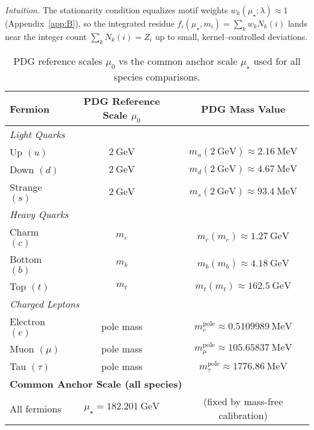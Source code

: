 \documentclass[aps,prd,onecolumn,amsmath,amssymb,superscriptaddress,nofootinbib,showpacs,showkeys]{revtex4-2}
\begin{document}
\emph{Intuition.} The stationarity condition equalizes motif weights $w_k(\mu_\star;\lambda)\approx1$ (Appendix~\ref{app:B}), so the integrated residue $f_i(\mu_\star,m_i)=\sum_k w_k N_k(i)$ lands near the integer count $\sum_k N_k(i)=Z_i$ up to small, kernel–controlled deviations.




\begin{table}[h!]
\centering
\caption{PDG reference scales \texorpdfstring{$\mu_0$}{mu0} vs the common anchor scale \texorpdfstring{$\mu_\star$}{mu*} used for all species comparisons.}
\label{tab:scales}
\begin{tabular}{lcc}
\toprule
\textbf{Fermion} & \textbf{PDG Reference Scale $\mu_0$} & \textbf{PDG Mass Value} \\
\midrule
\multicolumn{3}{l}{\textit{Light Quarks}} \\
Up $(u)$      & $2~\mathrm{GeV}$ & $m_u(2~\mathrm{GeV}) \approx 2.16~\mathrm{MeV}$ \\
Down $(d)$    & $2~\mathrm{GeV}$ & $m_d(2~\mathrm{GeV}) \approx 4.67~\mathrm{MeV}$ \\
Strange $(s)$ & $2~\mathrm{GeV}$ & $m_s(2~\mathrm{GeV}) \approx 93.4~\mathrm{MeV}$ \\
\midrule
\multicolumn{3}{l}{\textit{Heavy Quarks}} \\
Charm $(c)$   & $m_c$ & $m_c(m_c) \approx 1.27~\mathrm{GeV}$ \\
Bottom $(b)$  & $m_b$ & $m_b(m_b) \approx 4.18~\mathrm{GeV}$ \\
Top $(t)$     & $m_t$ & $m_t(m_t) \approx 162.5~\mathrm{GeV}$ \\
\midrule
\multicolumn{3}{l}{\textit{Charged Leptons}} \\
Electron $(e)$ & pole mass & $m_e^{\mathrm{pole}} \approx 0.5109989~\mathrm{MeV}$ \\
Muon $(\mu)$   & pole mass & $m_\mu^{\mathrm{pole}} \approx 105.65837~\mathrm{MeV}$ \\
Tau $(\tau)$   & pole mass & $m_\tau^{\mathrm{pole}} \approx 1776.86~\mathrm{MeV}$ \\
\midrule
\midrule
\multicolumn{3}{l}{\textbf{Common Anchor Scale (all species)}} \\
All fermions & $\mu_\star = 182.201~\mathrm{GeV}$ & (fixed by mass-free calibration) \\
\bottomrule
\end{tabular}
\end{table}
\end{document}
